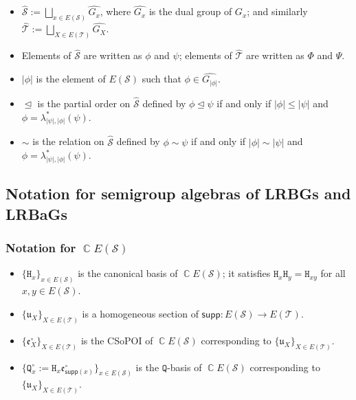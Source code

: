 \documentclass[11pt, oneside, reqno]{amsart}
\theoremstyle{definition}
\numberwithin{equation}{section}
\DeclareMathOperator{\C}{\mathbb{C}}
\def \SS{{\mathcal{S}}}
\def \TT{{\mathcal{T}}}
\def \kk{\C}
\def \uu{{\mathfrak{u}}}
\def \ee{{\mathfrak{e}}}
\def \wh{\widehat}
\DeclareMathOperator{\chleq}{\unlhd}
\def \supp{\mathsf{supp}}
\newcommand{\B}[1]{\mathtt{#1}} 			%
\begin{document}
\begin{itemize}[wide]
    \item
        $\wh{\SS} := \bigsqcup_{x \in E(\SS)} \wh{G_x}$,
        where $\wh{G_x}$ is the dual group of $G_x$;
        and similarly
        $\wh{\TT} := \bigsqcup_{X \in E(\TT)} \wh{G_X}$.

    \item
        Elements of $\wh{\SS}$ are written as $\phi$ and $\psi$;
        elements of $\wh{\TT}$ are written as $\Phi$ and $\Psi$.

    \item
        $|\phi|$ is the element of $E(\SS)$ such that $\phi \in \wh{G_{|\phi|}}$.

    \item
        $\chleq$ is the partial order on $\wh{\SS}$ defined by
        $\phi \chleq \psi$ if and only if $|\phi| \leq |\psi|$ and $\phi = \lambda_{|\psi|,|\phi|}^*(\psi)$.

    \item
        $\sim$ is the relation on $\wh{\SS}$ defined by
        $\phi \sim \psi$ if and only if
        $|\phi| \sim |\psi|$ and $\phi = \lambda_{|\psi|,|\phi|}^*(\psi)$.
\end{itemize}

\subsection*{Notation for semigroup algebras of LRBGs and LRBaGs}

\subsubsection*{Notation for $\kk E(\SS)$}

\begin{itemize}[wide]
    \item
        $\{\B{H}_{x}\}_{x \in E(\SS)}$ is the canonical basis of $\kk E(\SS)$;
        it satisfies $\B{H}_{x} \B{H}_{y} = \B{H}_{xy}$ for all $x, y \in E(\SS)$.

    \item
        $\{\uu_{X}\}_{X \in E(\TT)}$ is a homogeneous section of $\supp: E(\SS) \to E(\TT)$.

    \item
        $\{\ee^\circ_{X}\}_{X \in E(\TT)}$ is the CSoPOI of $\kk E(\SS)$
        corresponding to $\{\uu_{X}\}_{X \in E(\TT)}$.

    \item
        $\{\B{Q}^{\circ}_{x} := \B{H}_{x} \ee^\circ_{\supp(x)} \}_{x \in E(\SS)}$
        is the $\B{Q}$-basis of $\kk E(\SS)$ corresponding to $\{\uu_{X}\}_{X \in E(\TT)}$.
\end{itemize}
\end{document}
